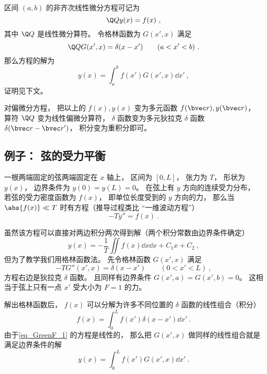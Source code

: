 

区间 $(a,b)$ 的非齐次线性微分方程可记为
\begin{equation}\label{eq_GreenF_5}
\Q Q y(x) = f(x)~,
\end{equation}
其中 $\Q Q$ 是线性微分算符。 令格林函数为 $G(x', x)$ 满足
\begin{equation}\label{eq_GreenF_7}
\Q Q G(x', x) = \delta(x - x') \qquad (a < x' < b)~.
\end{equation}
那么方程的解为
\begin{equation}\label{eq_GreenF_4}
y(x) = \int_a^b f(x') G(x', x) \dd{x'}~,
\end{equation}
证明见下文。

对偏微分方程， 把以上的 $f(x), y(x)$ 变为多元函数 $f(\bvec r), y(\bvec r)$， 算符 $\Q Q$ 变为线性偏微分算符， $\delta$ 函数变为多元狄拉克 $\delta$ 函数 $\delta(\bvec r - \bvec r')$， 积分变为重积分即可。

\subsection{例子： 弦的受力平衡}

一根两端固定的弦两端固定在 $x$ 轴上， 区间为 $[0, L]$， 张力为 $T$， 形状为 $y(x)$， 边界条件为 $y(0) = y(L) = 0$。 在弦上有 $y$ 方向的连续受力分布， 若弦的受力密度函数为 $f(x)$， 即单位长度受到的 $y$ 方向的力， 那么当 $\abs{f(x)} \ll T$ 时有方程（推导过程类比 “一维波动方程”）
\begin{equation}\label{eq_GreenF_1}
-T y'' = f(x)~.
\end{equation}

虽然该方程可以直接对两边积分两次得到解（两个积分常数由边界条件确定）
\begin{equation}\label{eq_GreenF_14}
y(x) = -\frac{1}{T}\iint f(x) \dd{x}\dd{x} + C_1 x + C_2~,
\end{equation}
但为了教学我们用格林函数法。 先令格林函数 $G(x', x)$ 满足
\begin{equation}\label{eq_GreenF_2}
-T G''(x', x) = \delta(x - x') \qquad (0 < x' < L)~,
\end{equation}
方程右边是狄拉克 $\delta$ 函数。 且同样有边界条件 $G(x', a) = G(x', b) = 0$。 这相当于弦上只有一点 $x'$ 受大小为 $F = 1$ 的力。

解出格林函数后， $f(x)$ 可以分解为许多不同位置的 $\delta$ 函数的线性组合（积分）
\begin{equation}
f(x) = \int_0^L f(x') \delta(x - x') \dd{x'}~.
\end{equation}
由于\autoref{eq_GreenF_1} 的方程是线性的， 那么把 $G(x', x)$ 做同样的线性组合就是满足边界条件的解
\begin{equation}\label{eq_GreenF_3}
y(x) = \int_0^L f(x') G(x', x) \dd{x'}~.
\end{equation}

